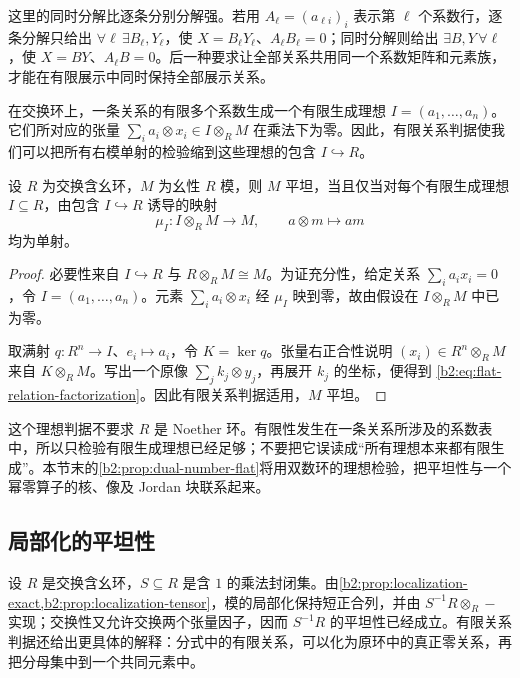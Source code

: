 这里的同时分解比逐条分别分解强。若用 \(A_\ell=(a_{\ell i})_i\) 表示第 \(\ell\) 个系数行，逐条分解只给出 \(\forall\ell\,\exists B_\ell,Y_\ell\)，使 \(X=B_\ell Y_\ell\)、\(A_\ell B_\ell=0\)；同时分解则给出 \(\exists B,Y\,\forall\ell\)，使 \(X=BY\)、\(A_\ell B=0\)。后一种要求让全部关系共用同一个系数矩阵和元素族，才能在有限展示中同时保持全部展示关系。

\ProseParagraphBreak
在交换环上，一条关系的有限多个系数生成一个有限生成理想 \(I=(a_1,\ldots,a_n)\)。它们所对应的张量 \(\sum_i a_i\otimes x_i\in I\otimes_RM\) 在乘法下为零。因此，有限关系判据使我们可以把所有右模单射的检验缩到这些理想的包含 \(I\hookrightarrow R\)。

\begin{theorem}[有限生成理想张量判据]\label{b2:thm:flat-ideal-criterion}
	设 \(R\) 为交换含幺环，\(M\) 为幺性 \(R\) 模，则 \(M\) 平坦，当且仅当对每个有限生成理想 \(I\subseteq R\)，由包含 \(I\hookrightarrow R\) 诱导的映射
	\[
		\mu_I:I\otimes_R M\longrightarrow M,\qquad a\otimes m\longmapsto am
	\]
	均为单射。
\end{theorem}
\begin{proof}
	必要性来自 \(I\hookrightarrow R\) 与 \(R\otimes_R M\cong M\)。为证充分性，给定关系 \(\sum_i a_i x_i=0\)，令 \(I=(a_1,\ldots,a_n)\)。元素 \(\sum_i a_i\otimes x_i\) 经 \(\mu_I\) 映到零，故由假设在 \(I\otimes_R M\) 中已为零。

	取满射 \(q:R^n\to I\)、\(e_i\mapsto a_i\)，令 \(K=\ker q\)。张量右正合性说明 \((x_i)\in R^n\otimes_R M\) 来自 \(K\otimes_R M\)。写出一个原像 \(\sum_j k_j\otimes y_j\)，再展开 \(k_j\) 的坐标，便得到 \eqref{b2:eq:flat-relation-factorization}。因此有限关系判据适用，\(M\) 平坦。
\end{proof}

这个理想判据不要求 \(R\) 是 Noether 环。有限性发生在一条关系所涉及的系数表中，所以只检验有限生成理想已经足够；不要把它误读成“所有理想本来都有限生成”。本节末的\cref{b2:prop:dual-number-flat}将用双数环的理想检验，把平坦性与一个幂零算子的核、像及 Jordan 块联系起来。

\subsection{局部化的平坦性}
\label{b2:subsec:0703:05}

设 \(R\) 是交换含幺环，\(S\subseteq R\) 是含 \(1\) 的乘法封闭集。由\cref{b2:prop:localization-exact,b2:prop:localization-tensor}，模的局部化保持短正合列，并由 \(S^{-1}R\otimes_R-\) 实现；交换性又允许交换两个张量因子，因而 \(S^{-1}R\) 的平坦性已经成立。有限关系判据还给出更具体的解释：分式中的有限关系，可以化为原环中的真正零关系，再把分母集中到一个共同元素中。

